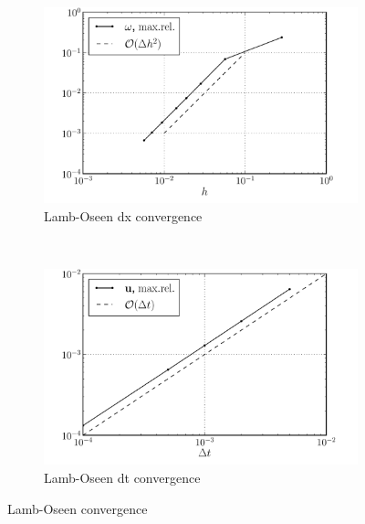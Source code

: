 	\begin{figure}[b]
        \centering
        \begin{subfigure}[b]{0.5\textwidth}
                \includegraphics[width=\textwidth]{figures/eulerian/lambOseen_eulerianConvergence_dx_compressed.pdf}
                \caption{Lamb-Oseen dx convergence}
                \label{fig:lambOseen_eulerianConvergence_dx}
        \end{subfigure}%
        ~ %
        \begin{subfigure}[b]{0.5\textwidth}
                \includegraphics[width=\textwidth]{figures/eulerian/lambOseen_eulerianConvergence_dt_compressed.pdf}
                \caption{Lamb-Oseen dt convergence}
                \label{fig:lambOseen_eulerianConvergence_dt}
        \end{subfigure}
        \caption{Lamb-Oseen convergence}
        \label{fig:lambOseen_eulerianConvergence}
	\end{figure}	


